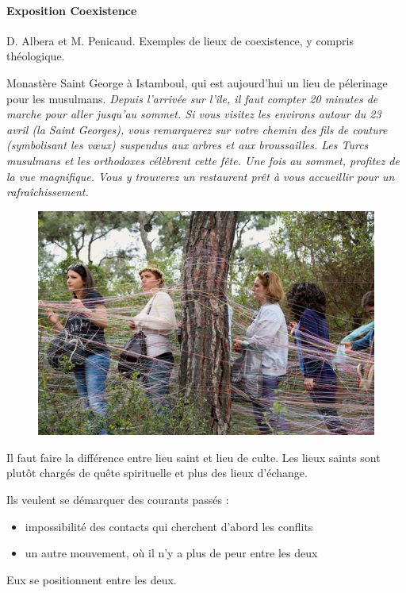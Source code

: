 \paragraph{Exposition Coexistence} D. Albera et M. Penicaud.  Exemples de lieux de coexistence, y compris théologique.
\begin{Ex}
    Monastère Saint George à Istamboul, qui est aujourd'hui un lieu de pélerinage pour les musulmans.
    \textit{Depuis l'arrivée sur l’île, il faut compter 20 minutes de marche pour aller jusqu'au sommet. Si vous visitez les environs autour du 23 avril (la Saint Georges), vous remarquerez sur votre chemin des fils de couture (symbolisant les vœux) suspendus aux arbres et aux broussailles. Les Turcs musulmans et les orthodoxes célèbrent cette fête. Une fois au sommet, profitez de la vue magnifique. Vous y trouverez un restaurent prêt à vous accueillir pour un rafraîchissement.}

    \begin{figure}
        \centering
        \includegraphics[width=\textwidth]{HistoireIslamMediterranee/Images/StGeorges.png}
 
        \label{fig:my_label}
    \end{figure}
\end{Ex}

Il faut faire la différence entre lieu saint et lieu de culte. Les lieux saints sont plutôt chargés de quête spirituelle et plus des lieux d'échange.

Ils veulent se démarquer des courants passés :
\begin{itemize}
    \item impossibilité des contacts qui cherchent d'abord les conflits
    \item un autre mouvement, où il n'y a  plus de peur entre les deux
\end{itemize}
Eux se positionnent entre les deux. 

